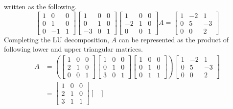 \documentclass[../main.tex]{subfiles}
\begin{document}
\begin{solution}
written as the following.
\[
\begin{bmatrix}
    1 & 0  & 0 \\
    0 & 1  & 0 \\
    0 & -1 & 1
\end{bmatrix}
\begin{bmatrix}
    1  & 0 & 0 \\
    0  & 1 & 0 \\
    -3 & 0 & 1
\end{bmatrix}
\begin{bmatrix}
    1  & 0 & 0 \\
    -2 & 1 & 0 \\
    0  & 0 & 1
\end{bmatrix}
A =
\begin{bmatrix}
    1 & -2 & 1 \\
    0 & 5  & -3 \\
    0 & 0  & 2
\end{bmatrix}
\]
Completing the LU decomposition, $A$ can be represented as the
product of following lower and upper triangular matrices.
\begin{align*}
    A
    &=
    \left(
    \begin{bmatrix}
        1 & 0 & 0 \\
        2 & 1 & 0 \\
        0 & 0 & 1
    \end{bmatrix}
    \begin{bmatrix}
        1 & 0 & 0 \\
        0 & 1 & 0 \\
        3 & 0 & 1
    \end{bmatrix}
    \begin{bmatrix}
        1 & 0 & 0 \\
        0 & 1 & 0 \\
        0 & 1 & 1
    \end{bmatrix}
    \right)
    \begin{bmatrix}
        1 & -2 & 1 \\
        0 & 5  & -3 \\
        0 & 0  & 2
    \end{bmatrix} \\
    &=
    \begin{bmatrix}
        1 & 0 & 0 \\
        2 & 1 & 0 \\
        3 & 1 & 1
    \end{bmatrix}
    \begin{bmatrix}

\end{bmatrix}
\end{align*}
\end{solution}
\end{document}
